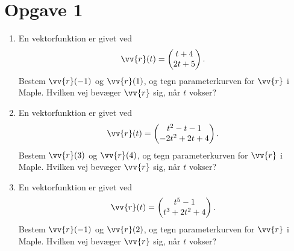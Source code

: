 \section*{Opgave 1}

\begin{enumerate}[label=\roman*)]
	\item En vektorfunktion er givet ved
	\begin{align*}
		\vv{r}(t) = 
		\begin{pmatrix}
			t+4 \\
			2t+5
		\end{pmatrix}.
	\end{align*}
	Bestem $\vv{r}(-1)$ og $\vv{r}(1)$, og tegn parameterkurven for $\vv{r}$ i Maple. Hvilken vej bevæger $\vv{r}$ sig, når $t$ vokser?
	\item En vektorfunktion er givet ved
	\begin{align*}
		\vv{r}(t) = 
		\begin{pmatrix}
			t^2-t-1 \\
			-2t^2+2t+4
		\end{pmatrix}.
	\end{align*}
	Bestem $\vv{r}(3)$ og $\vv{r}(4)$, og tegn parameterkurven for $\vv{r}$ i Maple. Hvilken vej bevæger $\vv{r}$ sig, når $t$ vokser?
	\item En vektorfunktion er givet ved
	\begin{align*}
		\vv{r}(t) = 
		\begin{pmatrix}
			t^5-1 \\
			t^3+2t^2+4
		\end{pmatrix}.
	\end{align*}
	Bestem $\vv{r}(-1)$ og $\vv{r}(2)$, og tegn parameterkurven for $\vv{r}$ i Maple. Hvilken vej bevæger $\vv{r}$ sig, når $t$ vokser?
\end{enumerate}

